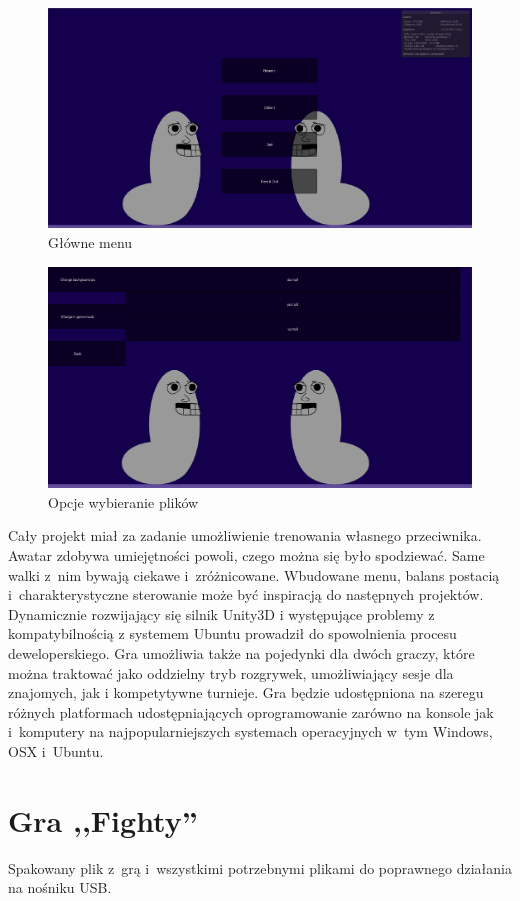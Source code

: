 \documentclass[brudnopis]{xmgr}
\begin{document}
\begin{figure}[!tbh]
\centering
\includegraphics[width=0.7\hsize]{fig/menu1}
\caption{Główne menu\label{RYS.6}}
\end{figure}
\begin{figure}[!tbh]
\centering
\includegraphics[width=0.7\hsize]{fig/menu2}
\caption{Opcje wybieranie plików\label{RYS.7}}
\end{figure}

\summary
Cały projekt miał za zadanie umożliwienie trenowania własnego
przeciwnika. Awatar zdobywa
umiejętności powoli, czego można się było spodziewać. Same walki z~nim
bywają ciekawe i~zróżnicowane. Wbudowane menu, balans postacią i~charakterystyczne
sterowanie może być inspiracją
do następnych projektów. Dynamicznie rozwijający się silnik Unity3D i występujące problemy z kompatybilnością z systemem Ubuntu prowadził do spowolnienia procesu deweloperskiego. Gra umożliwia także na pojedynki dla dwóch graczy, które można traktować jako oddzielny tryb rozgrywek, umożliwiający sesje dla znajomych, jak i kompetytywne turnieje. Gra będzie
udostępniona na szeregu różnych platformach udostępniających oprogramowanie zarówno na konsole jak i~komputery na najpopularniejszych systemach operacyjnych w~tym Windows, OSX i~Ubuntu. 
\appendix

\chapter{Gra ,,Fighty''}
Spakowany plik z~grą i~wszystkimi potrzebnymi plikami do poprawnego
działania na nośniku USB.
\end{document}
